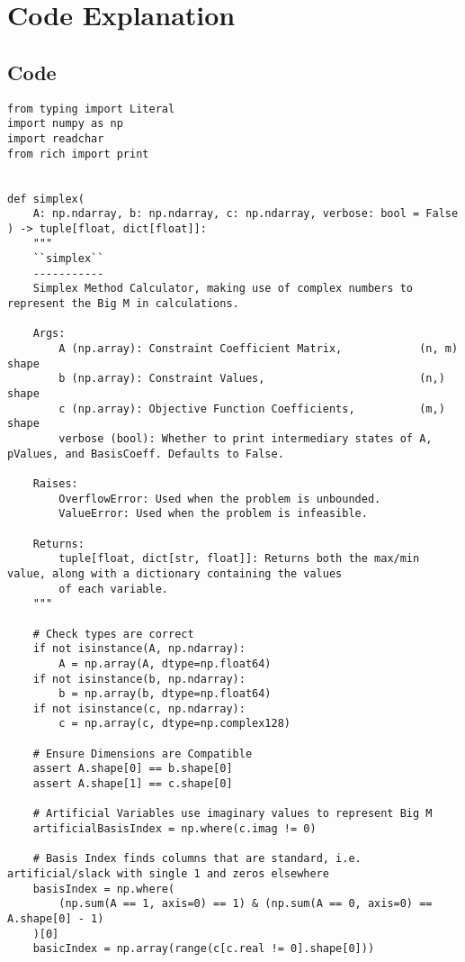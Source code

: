\documentclass[letterpaper, a4paper]{article}
\begin{document}
\section{Code Explanation}

\subsection{Code}
\begingroup
\fontsize{8pt}{10pt}\selectfont
\begin{verbatim}
from typing import Literal
import numpy as np
import readchar
from rich import print


def simplex(
    A: np.ndarray, b: np.ndarray, c: np.ndarray, verbose: bool = False
) -> tuple[float, dict[float]]:
    """
    ``simplex``
    -----------
    Simplex Method Calculator, making use of complex numbers to represent the Big M in calculations.

    Args:
        A (np.array): Constraint Coefficient Matrix,            (n, m) shape
        b (np.array): Constraint Values,                        (n,) shape
        c (np.array): Objective Function Coefficients,          (m,) shape
        verbose (bool): Whether to print intermediary states of A, pValues, and BasisCoeff. Defaults to False.

    Raises:
        OverflowError: Used when the problem is unbounded.
        ValueError: Used when the problem is infeasible.

    Returns:
        tuple[float, dict[str, float]]: Returns both the max/min value, along with a dictionary containing the values
        of each variable.
    """

    # Check types are correct
    if not isinstance(A, np.ndarray):
        A = np.array(A, dtype=np.float64)
    if not isinstance(b, np.ndarray):
        b = np.array(b, dtype=np.float64)
    if not isinstance(c, np.ndarray):
        c = np.array(c, dtype=np.complex128)

    # Ensure Dimensions are Compatible
    assert A.shape[0] == b.shape[0]
    assert A.shape[1] == c.shape[0]

    # Artificial Variables use imaginary values to represent Big M
    artificialBasisIndex = np.where(c.imag != 0)

    # Basis Index finds columns that are standard, i.e. artificial/slack with single 1 and zeros elsewhere
    basisIndex = np.where(
        (np.sum(A == 1, axis=0) == 1) & (np.sum(A == 0, axis=0) == A.shape[0] - 1)
    )[0]
    basicIndex = np.array(range(c[c.real != 0].shape[0]))


\end{verbatim}
\end{document}

